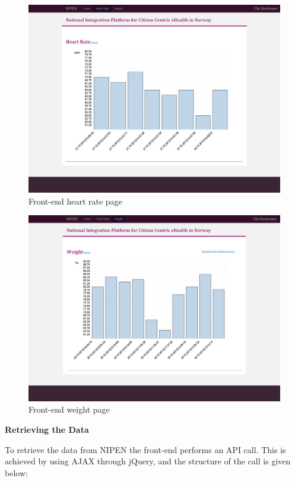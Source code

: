 \begin{figure}[H]
\centering
\includegraphics[scale=0.4]{../Figures/frontend-heart-rate-page.png}
\caption{Front-end heart rate page}
\label{figure:frontend-heart-rate-page}
\end{figure}

\begin{figure}[H]
\centering
\includegraphics[scale=0.4]{../Figures/frontend-weight-page.png}
\caption{Front-end weight page}
\label{figure:frontend-weight-page}
\end{figure}

\textbf{Retrieving the Data}

To retrieve the data from NIPEN the front-end performs an API call.
This is achieved by using AJAX through jQuery, and the structure of the call is given below:

